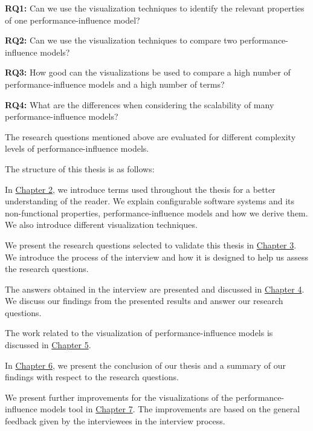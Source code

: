 \textbf{RQ1:} Can we use the visualization techniques to identify the relevant properties of one performance-influence model?

\textbf{RQ2:} Can we use the visualization techniques to compare two performance-influence models?

\textbf{RQ3:} How good can the visualizations be used to compare a high number of performance-influence models and a high number of terms?

\textbf{RQ4:} What are the differences when considering the scalability of many performance-influence models?

The research questions mentioned above are evaluated for different complexity levels of performance-influence models.

The structure of this thesis is as follows:

In \hyperref[background]{Chapter 2}, we introduce terms used throughout the thesis for a better understanding of the reader. We explain configurable software systems and its non-functional properties, performance-influence models and how we derive them. We also introduce different visualization techniques.

We present the research questions selected to validate this thesis in \hyperref[methodology]{Chapter 3}. We introduce the process of the interview and how it is designed to help us assess the research questions.

The answers obtained in the interview are presented and discussed in \hyperref[evaluation]{Chapter 4}. We discuss our findings from the presented results and answer our research questions.

The work related to the visualization of performance-influence models is discussed in \hyperref[relatedwork]{Chapter 5}.

In \hyperref[conclusion]{Chapter 6}, we present the conclusion of our thesis and a summary of our findings with respect to the research questions.

We present further improvements for the visualizations of the performance-influence models tool in \hyperref[futurework]{Chapter 7}. The improvements are based on the general feedback given by the interviewees in the interview process.



